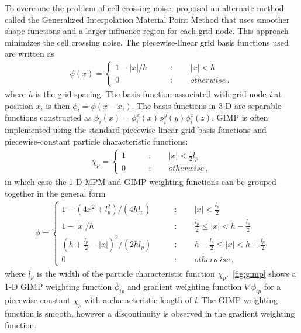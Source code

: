 To overcome the problem of cell crossing 
noise, \citet{Bardenhagen2004} proposed an alternate method called the 
Generalized Interpolation Material Point Method that uses smoother shape 
functions and a larger influence region for each grid node. This approach 
minimizes the cell crossing noise. The piecewise-linear grid basis functions 
used are written as
%
\begin{align}
\phi(x) = \begin{cases}
1-\left|x\right|/h \qquad &: \qquad \left|x\right| < h \\
0 \qquad &: \qquad otherwise \,,
\end{cases}
\end{align}
where \textit{h} is the grid spacing. The basis function associated with grid 
node \textit{i} at position $x_i$ is then $\phi_i=\phi(x - x_i)$. The basis 
functions in 3-D are separable functions constructed as $\phi_i(x) = \phi_i^x(x)
\phi_i^y(y)\phi_i^z(z)$. GIMP is often implemented using the standard 
piecewise-linear grid basis functions and piecewise-constant particle 
characteristic functions:
\begin{align}
\chi_p = \begin{cases}
1 \qquad &: \qquad \left|x\right| < \frac{1}{2}l_p \\
0 \qquad &: \qquad otherwise \,,
\end{cases}
\end{align}
%
in which case the 1-D MPM and GIMP weighting functions can be grouped together 
in the general form
%
\begin{align}
\phi = \begin{cases}
1 - (4x^2+l_p^2)/(4hl_p)\qquad &: \qquad \left|x\right| < \frac{l_p}{2} \\
1 - \left|x\right|/h \qquad &: \qquad \frac{l_p}{2} \le \left|x\right| < h - 
\frac{l_p}{2} \\
\left(h +\frac{l_p}{2} - \left|x\right| \right)^2/(2hl_p) \qquad &: \qquad h - 
\frac{l_p}{2} \le \left|x\right| < h +
\frac{l_p}{2} \\
0 \qquad &: \qquad otherwise \,,
\end{cases}
\end{align}
%
where $l_p$ is the width of the particle characteristic function 
$\chi_p$.~\cref{fig:gimp} shows a 1-D GIMP weighting function $\bar{\phi}_{ip}$ 
and gradient weighting function $\bar{\nabla\phi}_{ip}$ for a 
piecewise-constant $\chi_p$ with a characteristic length of \textit{l}. The 
GIMP weighting function is smooth, however a discontinuity is observed in the 
gradient weighting function. 


